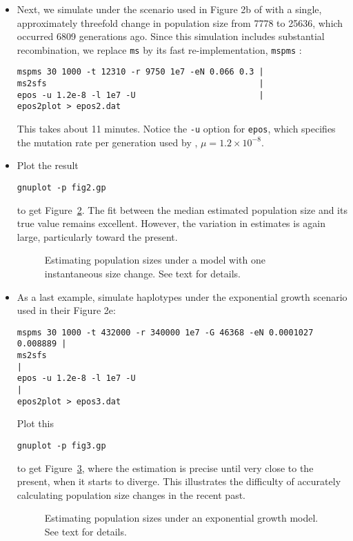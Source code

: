 \documentclass[a4paper, english]{article}
\newcommand{\ty}{\texttt}
\begin{document}
\begin{itemize}
\begin{figure}
{  text.}\label{fig:con}
\end{figure}
\item Next, we simulate under the scenario used in Figure 2b of \cite{liu15:exp}
  with a single, approximately threefold change in population size
  from 7778 to 25636, which occurred 6809 generations ago. Since this simulation includes substantial recombination, we
  replace \ty{ms} by its fast re-implementation, \ty{mspms}
  \citep{kel16:eff}:
\begin{verbatim}
mspms 30 1000 -t 12310 -r 9750 1e7 -eN 0.066 0.3 |
ms2sfs                                           |
epos -u 1.2e-8 -l 1e7 -U                         |
epos2plot > epos2.dat
\end{verbatim}
This takes about 11 minutes. Notice the \ty{-u} option for \ty{epos},
which specifies the mutation rate per generation used by \cite{liu15:exp}, $\mu=1.2\times
10^{-8}$.
\item Plot the result
\begin{verbatim}
gnuplot -p fig2.gp
\end{verbatim}
to get Figure~\ref{fig:2b}. The fit between the median estimated
population size and its true value remains excellent. However, the
variation in estimates is again large, particularly toward the present.
\begin{figure}
  \begin{center}
    \scalebox{0.6}{}
  \end{center}
  \caption{Estimating population sizes under a model with one
    instantaneous size change. See text for details.}\label{fig:2b}
\end{figure}
\item As a last example, simulate haplotypes under
  the exponential growth scenario \cite{liu15:exp} used in their
  Figure 2e:
    \small
\begin{verbatim}
mspms 30 1000 -t 432000 -r 340000 1e7 -G 46368 -eN 0.0001027 0.008889 |
ms2sfs                                                                |
epos -u 1.2e-8 -l 1e7 -U                                              |
epos2plot > epos3.dat
\end{verbatim}
\normalsize
Plot this
\begin{verbatim}
gnuplot -p fig3.gp
\end{verbatim}
to get Figure~\ref{fig:2e}, where the estimation is precise until very
close to the present, when it starts to diverge. This illustrates
the difficulty of accurately calculating population size changes
in the recent past.
\begin{figure}
  \begin{center}
    \scalebox{0.6}{}
  \end{center}
  \caption{Estimating population sizes under an exponential growth
    model. See text for details.}\label{fig:2e}
\end{figure}
\end{itemize}
\end{document}
